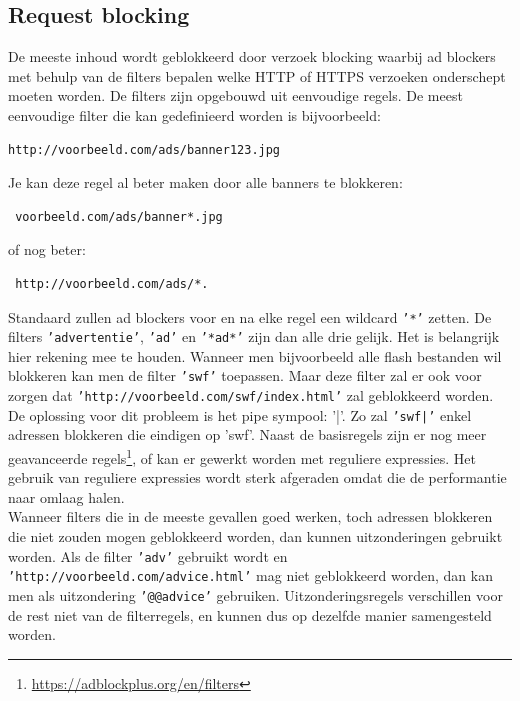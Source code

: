 \documentclass[pdftex,a4paper,12pt,twoside]{report}
\begin{document}
\subsection{Request blocking}
\label{sec:Request blocking}
De meeste inhoud wordt geblokkeerd door verzoek blocking waarbij ad blockers met behulp van de filters bepalen welke HTTP of HTTPS verzoeken onderschept moeten worden. De filters zijn opgebouwd uit eenvoudige regels. De meest eenvoudige filter die kan gedefinieerd worden is bijvoorbeeld:
\lstset{language=Html,tabsize=2}  
\begin{lstlisting}
http://voorbeeld.com/ads/banner123.jpg
\end{lstlisting}
Je kan deze regel al beter maken door alle banners te blokkeren:
\lstset{language=Html,tabsize=2}  
\begin{lstlisting}
 voorbeeld.com/ads/banner*.jpg 
\end{lstlisting}
 of nog beter:
\lstset{language=Html,tabsize=2}  
\begin{lstlisting}
 http://voorbeeld.com/ads/*.
\end{lstlisting}
Standaard zullen ad blockers voor en na elke regel een wildcard \texttt{'*'} zetten. De filters \texttt{'advertentie'}, \texttt{'ad'} en \texttt{'*ad*'} zijn dan alle drie gelijk. Het is belangrijk hier rekening mee te houden. Wanneer men bijvoorbeeld alle flash bestanden wil blokkeren kan men de filter \texttt{'swf'} toepassen. Maar deze filter zal er ook voor zorgen dat \texttt{'http://voorbeeld.com/swf/index.html'} zal geblokkeerd worden. De oplossing voor dit probleem is het pipe sympool: '|'. Zo zal \texttt{'swf|'} enkel adressen blokkeren die eindigen op 'swf'.
Naast de basisregels zijn er nog meer geavanceerde regels\footnote{\url{https://adblockplus.org/en/filters}}, of kan er gewerkt worden met reguliere expressies. Het gebruik van reguliere expressies wordt sterk afgeraden omdat die de performantie naar omlaag halen.
\\
Wanneer filters die in de meeste gevallen goed werken, toch adressen blokkeren die niet zouden mogen geblokkeerd worden, dan kunnen uitzonderingen gebruikt worden. Als de filter \texttt{'adv'} gebruikt wordt en \texttt{'http://voorbeeld.com/advice.html'} mag niet geblokkeerd worden, dan kan men als uitzondering \texttt{'@@advice'} gebruiken. Uitzonderingsregels verschillen voor de rest niet van de filterregels, en kunnen dus op dezelfde manier samengesteld worden.
\end{document}

